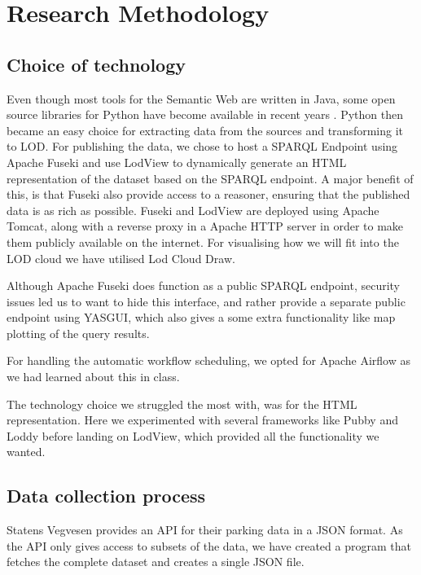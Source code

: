 \chapter{Research Methodology}

\section{Choice of technology}
Even though most tools for the Semantic Web are written in Java, some open source libraries for Python have become available in recent years \cite{w3java}. Python then became an easy choice for extracting data from the sources and transforming it to LOD. For publishing the data, we chose to host a SPARQL Endpoint using Apache Fuseki and use LodView to dynamically generate an HTML representation of the dataset based on the SPARQL endpoint. A major benefit of this, is that Fuseki also provide access to a reasoner, ensuring that the published data is as rich as possible. Fuseki and LodView are deployed using Apache Tomcat, along with a reverse proxy in a Apache HTTP server in order to make them publicly available on the internet. For visualising how we will fit into the LOD cloud we have utilised Lod Cloud Draw.

\vspace{5mm}

Although Apache Fuseki does function as a public SPARQL endpoint, security issues led us to want to hide this interface, and rather provide a separate public endpoint using YASGUI, which also gives a some extra functionality like map plotting of the query results.

\vspace{5mm}

For handling the automatic workflow scheduling, we opted for Apache Airflow as we had learned about this in class.

\vspace{5mm}

The technology choice we struggled the most with, was for the HTML representation. Here we experimented with several frameworks like Pubby and Loddy before landing on LodView, which provided all the functionality we wanted.

\section{Data collection process}
Statens Vegvesen \cite{statensvegvesen} provides an API for their parking data in a JSON format. As the API only gives access to subsets of the data, we have created a program that fetches the complete dataset and creates a single JSON file.

